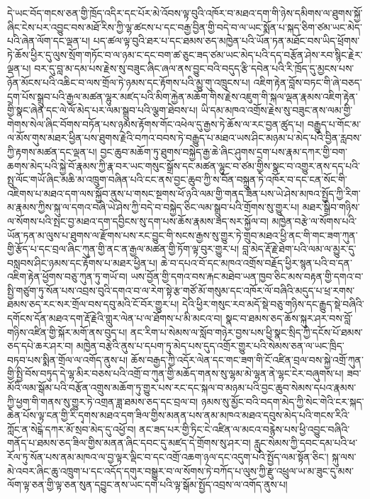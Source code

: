 \documentclass{article}
\begin{document}
དེ་ཡང་བོད་གངས་ཅན་གྱི་ཁྲོད་འདིར་དང་པོར་མེ་འོབས་ལྟ་བུའི་འཁོར་བ་མཐའ་དག་གི་ཉེས་དམིགས་ལ་ཐུགས་སྐྱོ་ཞིང་ངེས་པར་འབྱུང་བས་མཐོ་རིས་ཀྱི་ལྷ་ཚངས་པ་དང་བརྒྱ་བྱིན་གྱི་བདེ་བ་ལ་ཡང་སྨོན་པ་སྐད་ཅིག་ཙམ་ཡང་མེད་པའི་ཞེན་ལོག་དང་ལྡན་པ། པད་ཚལ་ལྟ་བུའི་ཐར་པ་དང་ཐམས་ཅད་མཁྱེན་པའི་ཡོན་ཏན་མཐོང་བས་ཡིད་ཕྲོགས་ཏེ་ཆོས་ཕྱིར་དུ་ལུས་སྲོག་གཏོང་བ་ལ་ཉམ་ང་དང་བག་ཚ་ཅུང་ཟད་ཙམ་ཡང་མེད་པའི་དད་བརྩོན་ཤེས་རབ་སྙིང་རྗེར་ལྡན་པ། བར་དུ་བླ་མ་དམ་པས་རྗེས་སུ་བཟུང་ཞིང་ཞལ་ནས་བྱུང་བའི་བདུད་རྩི་དབེན་པའི་རི་ཁྲོད་དུ་མྱངས་པས་ཉོན་མོངས་པའི་འཆིང་བ་ལས་གྲོལ་ཏེ་ཉམས་དང་རྟོགས་པའི་མྱུ་གུ་འཁྲུངས་པ། འཇིག་རྟེན་བློས་བཏང་གི་ཞེ་བཅད་དྲག་པོས་སྒྲུབ་པའི་རྒྱལ་མཚན་ལྷུར་མཛད་པའི་མིག་རྐྱེན་མཆོག་གིས་རྗེས་འཇུག་གི་སྐལ་ལྡན་རྣམས་འཇིག་རྟེན་གྱི་སྣང་ཞེན་དང་ལེ་ལོ་མེད་པར་ལམ་སྒྲུབ་པའི་ལྕག་ཐེབས་པ། ཡི་དམ་མཁའ་འགྲོས་རྗེས་སུ་བཟུང་ནས་ལམ་གྱི་གེགས་སེལ་ཞིང་བོགས་བཏོན་པས་ཉམས་རྟོགས་གོང་འཕེལ་དུ་རྒྱས་ཏེ་ཆོས་ལ་རང་བྱན་ཚུད་པ། བརྒྱུད་པ་གོང་མ་ལ་མོས་གུས་མཐར་ཕྱིན་པས་ཐུགས་རྗེའི་བཀའ་བབས་ཏེ་བརྒྱུད་པ་མཐའ་ཡས་ཤིང་མཉམ་པ་མེད་པའི་བྱིན་རླབས་ཀྱི་རྟགས་མཚན་དང་ལྡན་པ། བྱང་ཆུབ་མཆོག་ཏུ་ཐུགས་བསྐྱེད་རྒྱ་ཆེ་ཞིང་ཤུགས་དྲག་པས་རྣམ་དཀར་གྱི་བག་ཆགས་མེད་པའི་སྐྱེ་བོ་རྣམས་ཀྱི་རྣ་བར་ཡང་གསུང་སྒྲོས་དང་མཚན་ལྷུང་བ་ཙམ་གྱིས་སྣང་བ་འགྱུར་ནས་དད་པའི་སྤུ་ལོང་གཡོ་ཞིང་མཆི་མ་འཁྲུག་བཞིན་པའི་ངང་ནས་བྱང་ཆུབ་ཀྱི་ས་བོན་བསྐྲུན་ཏེ་འཁོར་བ་དང་ངན་སོང་གི་འཇིགས་པ་མཐའ་དག་ལས་སྐྱོབ་ནུས་པ་གསང་སྔགས་ཕོ་ཉའི་ལམ་གྱི་གནད་ཟིན་པས་ཡེ་ཤེས་མཁའ་སྤྱོད་ཀྱི་རིག་མ་རྣམས་ཀྱིས་སྐུ་ལ་དགའ་བཞི་ཡེ་ཤེས་ཀྱི་བདེ་བ་བསྐྱེད་ཅིང་ལམ་སྒྲུབ་པའི་གྲོགས་སུ་གྱུར་པ། མཐར་སྒྲིབ་གཉིས་ལ་སོགས་པའི་སྤང་བྱ་མཐའ་དག་དབྱིངས་སུ་དག་པས་ཆོས་རྣམས་ཟད་སར་སྐྱོལ་བ། མཁྱེན་བརྩེ་ལ་སོགས་པའི་ཡོན་ཏན་མ་ལུས་པ་ཐུགས་ལ་རྫོགས་པས་རང་བྱུང་གི་སངས་རྒྱས་སུ་གྱུར་ཏེ་གྲུབ་མཐའ་ཕྱི་ནང་གི་གང་ཟག་ཀུན་གྱི་རྩོད་པ་དང་བྲལ་ཞིང་ཀུན་གྱི་ནང་ན་རྒྱལ་མཚན་གྱི་ཏོག་ལྟ་བུར་གྱུར་པ། བླ་མེད་རྡོ་རྗེ་ཐེག་པའི་ལམ་ལ་མྱུར་དུ་བསླབས་ཤིང་ཉམས་དང་རྟོགས་པ་མཐར་ཕྱིན་པ། ཆེ་བ་དཔའ་བོ་དང་མཁའ་འགྲོས་བརྗོད་ཕྱིར་སྙན་པའི་བ་དན་འཇིག་རྟེན་ཕྱོགས་བཅུ་ཀུན་ཏུ་གཡོ་བ། ཡས་བྱོན་གྱི་དགའ་བས་རྐང་མཐེབ་ཡན་ཁྱབ་ཅིང་མས་བརྟན་གྱི་དགའ་བ་སྤྱི་གཙུག་ཏུ་སོན་པས་འབྲས་བུའི་དགའ་བ་ལ་རེག་སྟེ་རྩ་གཙོ་མོ་གསུམ་དང་འཁོར་ལོ་བཞིའི་མདུད་པ་ཕྲ་རགས་ཐམས་ཅད་རང་སར་གྲོལ་བས་དབུ་མའི་ངོ་བོར་གྱུར་པ། དེའི་ཕྱིར་གསུང་རབ་མདོ་སྡེ་བཅུ་གཉིས་དང་རྒྱུད་སྡེ་བཞིའི་དགོངས་དོན་མཐའ་དག་རྡོ་རྗེའི་གླུར་ལེན་པ་ལ་ཐོགས་པ་མི་མངའ་བ། སྣང་བ་ཐམས་ཅད་ཆོས་སྐུར་ཤར་བས་བློ་གཉིས་འཛིན་གྱི་སྐོར་མགོ་ནས་བུད་པ། ནང་རིག་པ་སེམས་ལ་སློབ་གཉེར་བྱས་པས་ཕྱི་སྣང་སྲིད་ཀྱི་དངོས་པོ་ཐམས་ཅད་དཔེ་ཆར་ཤར་བ། མཁྱེན་བརྩེའི་ནུས་པ་དཔག་ཏུ་མེད་པས་དུད་འགྲོར་གྱུར་པའི་སེམས་ཅན་ལ་ཡང་ཁྲིད་བཏབ་པས་སྨིན་གྲོལ་ལ་འགོད་ནུས་པ། ཆོས་བརྒྱད་ཀྱི་འདོར་ལེན་དང་གང་ཟག་གི་ངོ་འཛིན་བྲལ་བས་སྐྱེ་འགྲོ་ཀུན་གྱི་སྤྱི་བོས་བཏུད་དེ་ལྷ་མིར་བཅས་པའི་འགྲོ་བ་ཀུན་གྱི་མཆོད་གནས་སུ་ལྷམ་མེ་ལྷན་ནེ་ལྷང་ངེར་བཞུགས་པ། ཟབ་མོའི་ལམ་སྒོམ་པའི་བརྩོན་འགྲུས་མཆོག་ཏུ་གྱུར་པས་རང་དང་སྐལ་བ་མཉམ་པའི་བྱང་ཆུབ་སེམས་དཔའ་རྣམས་ཀྱི་ཕྱག་གི་གནས་སུ་གྱུར་ཏེ་འགྲན་ཟླ་ཐམས་ཅད་དང་བྲལ་བ། ཉམས་སུ་མྱོང་བའི་བདག་མེད་ཀྱི་སེང་གེའི་ངར་སྐད་ཆེན་པོས་ལྟ་ངན་གྱི་རི་དྭགས་མཐའ་དག་ཟིལ་གྱིས་མནན་པས་ནམ་མཁའ་མཐའ་དབུས་མེད་པའི་གངས་རིའི་ཀློང་ན་སེངྒེ་དཀར་མོ་སྲབ་མེད་དུ་འཕྱོ་བ། ནང་ཟད་པར་གྱི་ཏིང་ངེ་འཛིན་ལ་མངའ་བརྙེས་པས་ཕྱི་འབྱུང་བཞིའི་གནོད་པ་ཐམས་ཅད་ཟིལ་གྱིས་མནན་ཞིང་དབང་དུ་མཛད་དེ་གྲོགས་སུ་ཤར་བ། རླུང་སེམས་ཀྱི་དབང་དམ་པའི་ཕ་རོལ་ཏུ་སོན་པས་ནམ་མཁའ་ལ་བྱ་ལྟར་ལྡིང་བ་དང་འགྲོ་འཆག་ཉལ་དང་འདུག་པའི་སྤྱོད་ལམ་སྟོན་ཅིང་། སྐུ་ལས་མེ་འབར་ཞིང་ཆུ་འཁྲུག་པ་དང་འདོད་དགུར་བསྒྱུར་བ་ལ་སོགས་ཏེ་བཀོད་པ་ལུས་ཀྱི་རྫུ་འཕྲུལ་ཡ་མ་ཟུང་དུ་མས་ལོག་ལྟ་ཅན་གྱི་ལྟ་ཅན་སུན་དབྱུང་ནས་ཡང་དག་པའི་ལྟ་སྒོམ་སྤྱོད་འབྲས་ལ་འགོད་ནུས་པ། 
\end{document}
